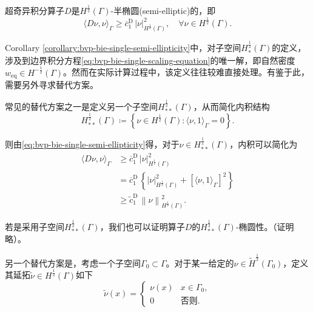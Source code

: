 \begin{corollary}[超奇异边界积分算子的半椭圆性]
  \label{corollary:bvp-bie-single-semi-ellipticity}
  超奇异积分算子$D$是$H^{\frac{1}{2}}(\Gamma)$-半椭圆(semi-elliptic)的，即
  \begin{equation}
    \label{eq:bvp-bie-single-semi-ellipticity}
    \langle D \nu, \nu \rangle_{\Gamma}
    \ge \overline{c}_{1}^{\text{D}} \, \left| \nu \right|_{H^{\frac{1}{2}}(\Gamma)}^{2}, \quad \forall \nu \in H^{\frac{1}{2}}(\Gamma).
  \end{equation}
\end{corollary}

  Corollary \ref{corollary:bvp-bie-single-semi-ellipticity}中，对子空间$H_{*}^{\frac{1}{2}}(\Gamma)$的定义，涉及到边界积分方程\eqref{eq:bvp-bie-single-scaling-equation}的唯一解，即自然密度$w_{\text{eq}} \in H^{-\frac{1}{2}}(\Gamma)$。然而在实际计算过程中，该定义往往较难直接处理。有鉴于此，需要另外寻求替代方案。

  常见的替代方案之一是定义另一个子空间$H_{**}^{\frac{1}{2}}(\Gamma)$，从而简化内积结构
  \begin{equation*}
    H_{**}^{\frac{1}{2}}(\Gamma) \coloneqq
    \left\{ \nu \in H^{\frac{1}{2}}(\Gamma): \langle \nu, 1 \rangle_{\Gamma} = 0 \right\}.
  \end{equation*}

则由\eqref{eq:bvp-bie-single-semi-ellipticity}得，对于$\nu \in H_{**}^{\frac{1}{2}}(\Gamma)$，内积可以简化为
\begin{equation}
  \label{eq:bvp-bie-single-innnerp-simplify-starstar}
  \begin{split}
  \langle D \nu, \nu \rangle_{\Gamma}
  & \ge \overline{c}_{1}^{\text{D}} \, \left| \nu \right|_{H^{\frac{1}{2}}(\Gamma)}^{2} \\
  & = \overline{c}_{1}^{\text{D}} \,
  \left\{
  \left| \nu \right|_{H^{\frac{1}{2}}(\Gamma)}^{2}
  + \left[
  \langle \nu, 1 \rangle_{\Gamma}
  \right]^2
  \right\}\\
  & \ge \widetilde{c}_{1}^{\text{D}} \,
  \left\| \nu \right\|_{H^{\frac{1}{2}}(\Gamma)}^{2}.
\end{split}
\end{equation}

若是采用子空间$H_{**}^{\frac{1}{2}}(\Gamma)$，我们也可以证明算子$D$的$H_{**}^{\frac{1}{2}}(\Gamma)$-椭圆性。（证明略）。

另一个替代方案是，考虑一个子空间$\Gamma_{0} \subset \Gamma$。对于某一给定的$\nu \in \widetilde{H}^{\frac{1}{2}}(\Gamma_{0})$，定义其延拓$\widetilde{\nu} \in H^{\frac{1}{2}}(\Gamma)$如下
\begin{equation*}
  \widetilde{\nu}(x) =
  \begin{cases}
    \nu(x) & x \in \Gamma_{0}, \\
    0 & \text{否则}.
  \end{cases}
\end{equation*}

